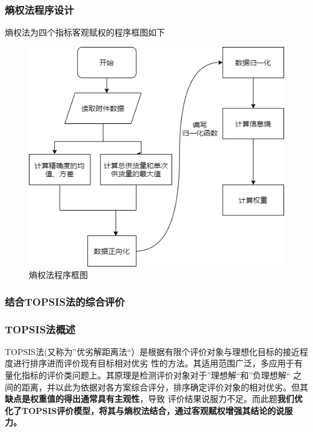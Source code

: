 \documentclass{cumcmthesis}
\begin{document}
\subsubsection*{熵权法程序设计}
熵权法为四个指标客观赋权的程序框图如下
\begin{figure}[H]
    \centering
    \includegraphics[scale=0.6]{shangquan.png}
    \caption{熵权法程序框图}     \label{fig:2}
\end{figure}
\subsubsection{结合TOPSIS法的综合评价}
\subsubsection*{TOPSIS法概述}
TOPSIS法(又称为”优劣解距离法“）是根据有限个评价对象与理想化目标的接近程度进行排序进而评价现有目标相对优劣
性的方法。其适用范围广泛，多应用于有量化指标的评价类问题上。其原理是检测评价对象对于”理想解“和”负理想解“
之间的距离，并以此为依据对各方案综合评分，排序确定评价对象的相对优劣。但其\textbf{缺点是权重值的得出通常具有主观性}，导致
评价结果说服力不足。而此题\textbf{我们优化了TOPSIS评价模型，将其与熵权法结合，通过客观赋权增强其结论的说服力。}
\end{document}
